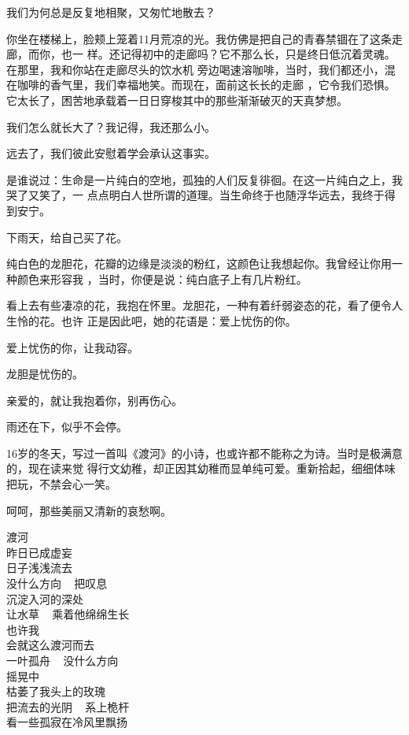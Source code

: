 \documentclass[12pt,a4paper]{article}
\begin{document}
		我们为何总是反复地相聚，又匆忙地散去？

		你坐在楼梯上，脸颊上笼着11月荒凉的光。我仿佛是把自己的青春禁锢在了这条走廊，而你，也一
	样。还记得初中的走廊吗？它不那么长，只是终日低沉着灵魂。在那里，我和你站在走廊尽头的饮水机
	旁边喝速溶咖啡，当时，我们都还小，混在咖啡的香气里，我们幸福地笑。而现在，面前这长长的走廊
	，它令我们恐惧。它太长了，困苦地承载着一日日穿梭其中的那些渐渐破灭的天真梦想。

		我们怎么就长大了？我记得，我还那么小。

		远去了，我们彼此安慰着学会承认这事实。

		是谁说过：生命是一片纯白的空地，孤独的人们反复徘徊。在这一片纯白之上，我哭了又笑了，一
	点点明白人世所谓的道理。当生命终于也随浮华远去，我终于得到安宁。

	\endwriting



		下雨天，给自己买了花。

		纯白色的龙胆花，花瓣的边缘是淡淡的粉红，这颜色让我想起你。我曾经让你用一种颜色来形容我
	，当时，你便是说：纯白底子上有几片粉红。

		看上去有些凄凉的花，我抱在怀里。龙胆花，一种有着纤弱姿态的花，看了便令人生怜的花。也许
	正是因此吧，她的花语是：爱上忧伤的你。

		爱上忧伤的你，让我动容。

		龙胆是忧伤的。

		亲爱的，就让我抱着你，别再伤心。

		雨还在下，似乎不会停。

	\endwriting



		16岁的冬天，写过一首叫《渡河》的小诗，也或许都不能称之为诗。当时是极满意的，现在读来觉
	得行文幼稚，却正因其幼稚而显单纯可爱。重新拾起，细细体味把玩，不禁会心一笑。

		呵呵，那些美丽又清新的哀愁啊。

		\longpoem{}{}{}
		渡河 \\
		昨日已成虚妄 \\
		日子浅浅流去 \\
		没什么方向 ~ 把叹息 \\
		沉淀入河的深处 \\
		让水草 ~ 乘着他绵绵生长 \\
		也许我 \\
		会就这么渡河而去 \\
		一叶孤舟 ~ 没什么方向 \\
		摇晃中 \\
		枯萎了我头上的玫瑰 \\
		把流去的光阴 ~ 系上桅杆 \\
		看一些孤寂在冷风里飘扬
		\endlongpoem
\end{document}
